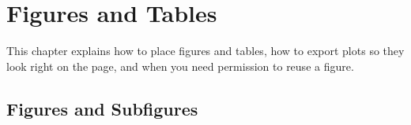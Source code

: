 %

\chapter{Figures and Tables}
\label{ch:figtables}

This chapter explains how to place figures and tables, how to export plots so they look right on the page, and when you need permission to reuse a figure.

\section{Figures and Subfigures}
\label{sec:figures}


